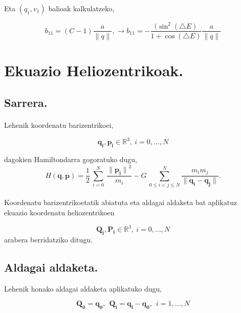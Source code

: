 Eta $(q_1,v_1)$ balioak kalkulatzeko,

\begin{equation*}
b_{11}=(C-1) \frac{a}{\|q\|}, \longrightarrow b_{11}=-\frac{(\sin^2(\triangle E)}{1+\cos(\triangle E)} \frac{a}{\|q\|}
\end{equation*}

\section{Ekuazio Heliozentrikoak.}

\subsection*{Sarrera.}

\paragraph*{} Lehenik koordenatu barizentrikoei,

\begin{equation*}
\mathbf{q_i}, \mathbf{p_i} \in \mathbb{R}^3, \ i=0,\dots,N
\end{equation*}

dagokien Hamiltondarra gogoratuko dugu, 
\begin{equation}
H(\mathbf{q},\mathbf{p})=\frac{1}{2}\ \sum^N_{i=0}{\ \frac{{\|\mathbf{p_i}\|}^2}{m_i}}-G\ \sum^N_{0\le i<j\le N}{\frac{m_im_j}{\|\mathbf{q_i}-\mathbf{q_j}\|}}.
\end{equation}

\paragraph*{} Koordenatu barizentrikoetatik abiatuta eta aldagai aldaketa bat aplikatuz ekuazio koordenatu heliozentrikoen

\begin{equation*}
\mathbf{Q_i}, \mathbf{P_i} \in \mathbb{R}^3, \ i=0,\dots,N
\end{equation*}
arabera berridatziko ditugu. 

\subsection*{Aldagai aldaketa.}

Lehenik honako aldagai aldaketa aplikatuko dugu,

\begin{equation*}
\mathbf{Q_0}=\mathbf{q_0}, \ \ \mathbf{Q_i}=\mathbf{q_i}-\mathbf{q_0}, \ \ i=1,\dots{,N}
\end{equation*}

